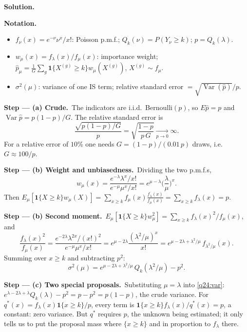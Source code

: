 \documentclass[11pt,a4paper]{article}
\numberwithin{equation}{questao}   %
\newenvironment{notacao}{\par\smallskip\noindent\textbf{Notation.}\begin{itemize}[leftmargin=1.4em,topsep=1pt,itemsep=0pt]\small}{\end{itemize}}
\newcommand{\passo}[2]{\par\smallskip\noindent\textbf{Step --- #1.}~#2}
\newcommand{\solhead}{\par\medskip\noindent{\color{blue!55!black}\rule{\linewidth}{0.3pt}}\par\noindent\textbf{Solution.}}
\newcommand{\Var}{\operatorname{Var}}
\newcommand{\1}{\mathbf{1}}
\begin{document}
\begin{sol}
\solhead
\begin{notacao}
\item $f_\nu(x)=e^{-\nu}\nu^x/x!$: Poisson p.m.f.; $Q_k(\nu)=P(Y_\nu\ge k)$; $p=Q_k(\lambda)$.
\item $w_\mu(x)=f_\lambda(x)/f_\mu(x)$: importance weight; $\hat p_\mu=\frac1G\sum_g\1\{X^{(g)}\ge k\}w_\mu(X^{(g)})$, $X^{(g)}\sim f_\mu$.
\item $\sigma^2(\mu)$: variance of one IS term; relative standard error $=\sqrt{\Var(\hat p)}/p$.
\end{notacao}

\passo{(a) Crude}{The indicators are i.i.d.\ Bernoulli$(p)$, so $E\hat p=p$ and $\Var\hat p=p(1-p)/G$.
The relative standard error is}
\begin{equation}\label{q24:rse}
\frac{\sqrt{p(1-p)/G}}{p}=\sqrt{\frac{1-p}{p\,G}}\xrightarrow[p\to0]{}\infty .
\end{equation}
For a relative error of $10\%$ one needs $G=(1-p)/(0.01\,p)$ draws, i.e.\ $G\approx100/p$.

\passo{(b) Weight and unbiasedness}{Dividing the two p.m.f.s,}
\begin{equation}\label{q24:w}
w_\mu(x)=\frac{e^{-\lambda}\lambda^x/x!}{e^{-\mu}\mu^x/x!}=e^{\mu-\lambda}\Big(\frac\lambda\mu\Big)^x .
\end{equation}
Then $E_\mu[\1\{X\ge k\}w_\mu(X)]=\sum_{x\ge k}f_\mu(x)\frac{f_\lambda(x)}{f_\mu(x)}=\sum_{x\ge k}f_\lambda(x)=p$.

\passo{(b) Second moment}{$E_\mu[\1\{X\ge k\}w_\mu^2]=\sum_{x\ge k}f_\lambda(x)^2/f_\mu(x)$, and}
\[
\frac{f_\lambda(x)^2}{f_\mu(x)}=\frac{e^{-2\lambda}\lambda^{2x}/(x!)^2}{e^{-\mu}\mu^x/x!}
=e^{\mu-2\lambda}\frac{(\lambda^2/\mu)^x}{x!}=e^{\mu-2\lambda+\lambda^2/\mu}\,f_{\lambda^2/\mu}(x).
\]
Summing over $x\ge k$ and subtracting $p^2$:
\begin{equation}\label{q24:var}
\sigma^2(\mu)=e^{\mu-2\lambda+\lambda^2/\mu}\,Q_k(\lambda^2/\mu)-p^2 .
\end{equation}

\passo{(c) Two special proposals}{Substituting $\mu=\lambda$ into \eqref{q24:var}:
$e^{\lambda-2\lambda+\lambda}Q_k(\lambda)-p^2=p-p^2=p(1-p)$, the crude variance. For
$q^*(x)=f_\lambda(x)\1\{x\ge k\}/p$, every term is $\1\{x\ge k\}f_\lambda(x)/q^*(x)=p$, a constant: zero
variance. But $q^*$ requires $p$, the unknown being estimated; it only tells us to put the proposal
mass where $\{x\ge k\}$ and in proportion to $f_\lambda$ there.}


\end{sol}
\end{document}
